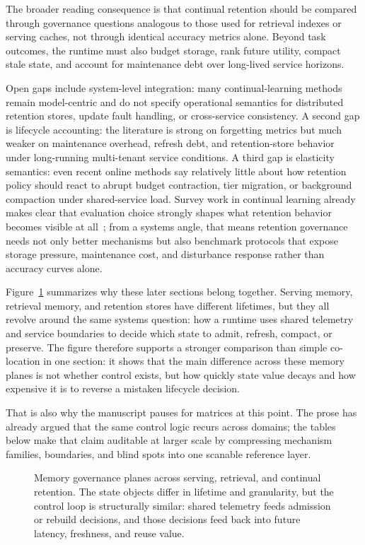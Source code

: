 \documentclass[acmsmall,screen,review]{acmart}
\begin{document}
The broader reading consequence is that continual retention should be compared through governance questions analogous to those used for retrieval indexes or serving caches, not through identical accuracy metrics alone. Beyond task outcomes, the runtime must also budget storage, rank future utility, compact stale state, and account for maintenance debt over long-lived service horizons.

Open gaps include system-level integration: many continual-learning methods remain model-centric and do not specify operational semantics for distributed retention stores, update fault handling, or cross-service consistency. A second gap is lifecycle accounting: the literature is strong on forgetting metrics but much weaker on maintenance overhead, refresh debt, and retention-store behavior under long-running multi-tenant service conditions. A third gap is elasticity semantics: even recent online methods say relatively little about how retention policy should react to abrupt budget contraction, tier migration, or background compaction under shared-service load. Survey work in continual learning already makes clear that evaluation choice strongly shapes what retention behavior becomes visible at all~\cite{delange2021survey}; from a systems angle, that means retention governance needs not only better mechanisms but also benchmark protocols that expose storage pressure, maintenance cost, and disturbance response rather than accuracy curves alone.

Figure~\ref{fig:memory-planes} summarizes why these later sections belong together. Serving memory, retrieval memory, and retention stores have different lifetimes, but they all revolve around the same systems question: how a runtime uses shared telemetry and service boundaries to decide which state to admit, refresh, compact, or preserve. The figure therefore supports a stronger comparison than simple co-location in one section: it shows that the main difference across these memory planes is not whether control exists, but how quickly state value decays and how expensive it is to reverse a mistaken lifecycle decision.

That is also why the manuscript pauses for matrices at this point. The prose has already argued that the same control logic recurs across domains; the tables below make that claim auditable at larger scale by compressing mechanism families, boundaries, and blind spots into one scanable reference layer.

\begin{figure}[t]
\centering
\resizebox{0.96\textwidth}{!}{}
\caption{Memory governance planes across serving, retrieval, and continual retention. The state objects differ in lifetime and granularity, but the control loop is structurally similar: shared telemetry feeds admission or rebuild decisions, and those decisions feed back into future latency, freshness, and reuse value.}
\label{fig:memory-planes}
\end{figure}
\end{document}
